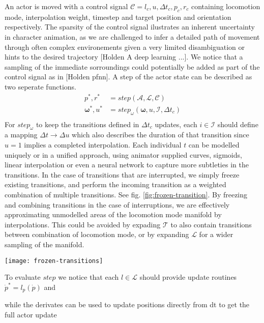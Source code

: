 An actor is moved with a control signal $\mathcal{C}=l_c, u, \Delta{t}_c, p_c,r_c$ containing locomotion mode, interpolation weight, timestep and target position and orientation respectively. The sparsity of the control signal ilustrates an inherent uncertainty in character animation, as we are challenged to infer a detailed path of movement through often complex environements given a very limited disambiguation or hints to the desired trajectory [Holden A deep learning ...]. We notice that a sampling of the immediate sorroundings could potentially be added as part of the control signal as in [Holden pfnn]. A step of the actor state can be described as two seperate functions.
\begin{equation}
\begin{split}
p^*,r^*&=step(\mathcal{A},\mathcal{L}, \mathcal{C})\\
\boldsymbol{\omega}^*,u^*&=step_{\omega}(\boldsymbol{\omega},u,\mathcal{I}, \Delta{t}_c)\\
\end{split}
\end{equation}
For $step_{\omega}$ to keep the transitions defined in $\Delta{t}_c$ updates, each $i\in\mathcal{I}$ should define a mapping $\Delta{t} \rightarrow{\Delta{u}}$ which also describes the duration of that transition since $u=1$ implies a completed interpolation. Each individual $t$ can be modelled uniquely or in a unified approach, using animator supplied curves, sigmoids, linear interpolation or even a neural network to capture more subtleties in the transitions. In the case of transitions that are interrupted, we simply freeze existing transitions, and perform the incoming transition as a weighted combination of multiple transitions. See fig. \ref{fig:frozen-transition}. By freezing and combining transitions in the case of interruptions, we are effectively approximating unmodelled areas of the locomotion mode manifold by interpolations. This could be avoided by expading $\mathcal{T}$ to also contain transitions between combination of locomotion mode, or by expanding $\mathcal{L}$ for a wider sampling of the manifold.  
\begin{figure*}
  \texttt{[image: frozen-transitions]}
  \caption{Frozen transition}
  \label{fig:frozen-transition}
\end{figure*}
To evaluate $step$ we notice that each $l\in\mathcal{L}$ should provide update routines $\dot{p}^*=l_p(\dot{p})$ and 

while the derivates can be used to update positions directly from dt to get the full actor update




